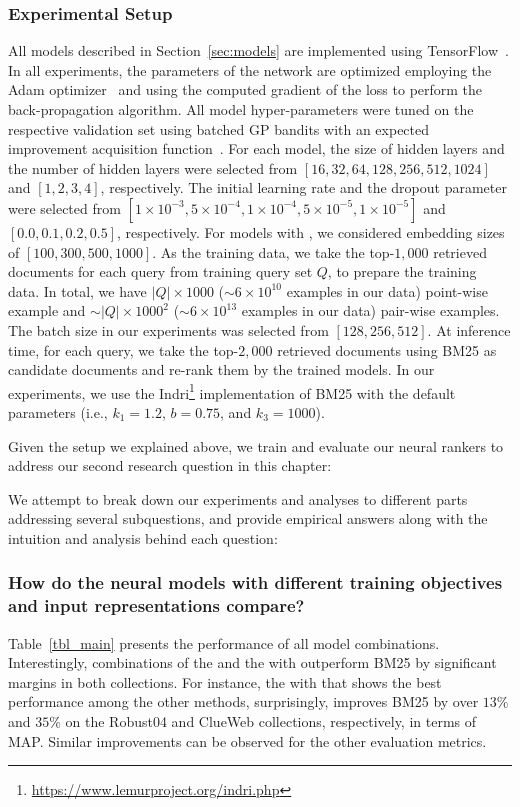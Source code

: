 \subsubsection{Experimental Setup}
All models described in Section~\ref{sec:models} are implemented using TensorFlow~\citep{tang2016:tflearn,tensorflow2015-whitepaper}.
In all experiments, the parameters of the network are optimized employing the Adam optimizer~\citep{Kingma:2014} and using the computed gradient of the loss to perform the back-propagation algorithm.
All model hyper-parameters were tuned on the respective validation set using batched GP bandits with an expected improvement acquisition function~\citep{Desautels:2014}. 
For each model, the size of hidden layers and the number of hidden layers were selected from $[16, 32, 64, 128, 256, 512, 1024]$ and $[1, 2, 3, 4]$, respectively. The initial learning rate and the dropout parameter were selected from $[1\times 10^{-3}, 5\times 10^{-4}, 1\times 10^{-4}, 5\times 10^{-5}, 1\times 10^{-5}]$ and $[0.0, 0.1, 0.2, 0.5]$, respectively. For models with \feedthree, we considered embedding sizes of $[100, 300, 500, 1000]$. As the training data, we take the top-$1,000$ retrieved documents for each query from training query set $Q$, to prepare the training data. In total, we have $|Q|\times 1000$ ($\sim6\times 10^{10}$ examples in our data) point-wise example and $\sim|Q|\times 1000^2$ ($\sim6\times 10^{13}$ examples in our data) pair-wise examples. The batch size in our experiments was selected from  $[128, 256, 512]$.
%
At inference time, for each query, we take the top-$2,000$ retrieved documents using BM25 as candidate documents and re-rank them by the trained models. In our experiments, we use the Indri\footnote{\url{https://www.lemurproject.org/indri.php}} implementation of BM25 with the default parameters (i.e., $k_1 = 1.2$, $b = 0.75$, and $k_3 = 1000$).


\bigskip
Given the setup we explained above, we train and evaluate our neural rankers to address our second research question in this chapter:

We attempt to break down our experiments and analyses to different parts addressing several subquestions, and provide empirical answers along with the intuition and analysis behind each question:

 
\subsubsection{How do the neural models with different training objectives and input representations compare?}
%
Table~\ref{tbl_main} presents the performance of all model combinations.
Interestingly, combinations of the \modeltwo and the \modelthree with \feedthree outperform BM25 by significant margins in both collections. For instance, the \modelthree with \feedthree that shows the best performance among the other methods, surprisingly, improves BM25 by over $13\%$ and $35\%$ on the Robust04 and ClueWeb collections, respectively, in terms of MAP. Similar improvements can be observed for the other evaluation metrics.

